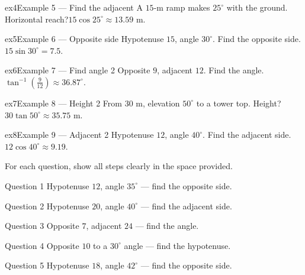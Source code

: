 \documentclass[11pt]{article}
\begin{document}
\begin{example}{ex4}{Example 5 --- Find the adjacent}
A $15$-m ramp makes $25^\circ$ with the ground. Horizontal reach?\soln $15\cos25^\circ\approx13.59$ m.
\end{example}

\begin{example}{ex5}{Example 6 --- Opposite side}
Hypotenuse $15$, angle $30^\circ$. Find the opposite side.\soln $15\sin30^\circ=7.5$.
\end{example}

\begin{example}{ex6}{Example 7 --- Find angle 2}
Opposite $9$, adjacent $12$. Find the angle.\soln $\tan^{-1}\!\left(\tfrac{9}{12}\right)\approx36.87^\circ$.
\end{example}

\begin{example}{ex7}{Example 8 --- Height 2}
From $30$ m, elevation $50^\circ$ to a tower top. Height?\soln $30\tan50^\circ\approx35.75$ m.
\end{example}

\begin{example}{ex8}{Example 9 --- Adjacent 2}
Hypotenuse $12$, angle $40^\circ$. Find the adjacent side.\soln $12\cos40^\circ\approx9.19$.
\end{example}

\clearpage
{}
For each question, show all steps clearly in the space provided.

\begin{qbox}{Question 1}
Hypotenuse $12$, angle $35^\circ$ — find the opposite side.\workspace{2.4cm}
\end{qbox}

\begin{qbox}{Question 2}
Hypotenuse $20$, angle $40^\circ$ — find the adjacent side.\workspace{2.4cm}
\end{qbox}

\begin{qbox}{Question 3}
Opposite $7$, adjacent $24$ — find the angle.\workspace{2.4cm}
\end{qbox}

\begin{qbox}{Question 4}
Opposite $10$ to a $30^\circ$ angle — find the hypotenuse.\workspace{2.4cm}
\end{qbox}

\begin{qbox}{Question 5}
Hypotenuse $18$, angle $42^\circ$ — find the opposite side.\workspace{2.4cm}
\end{qbox}
\end{document}

